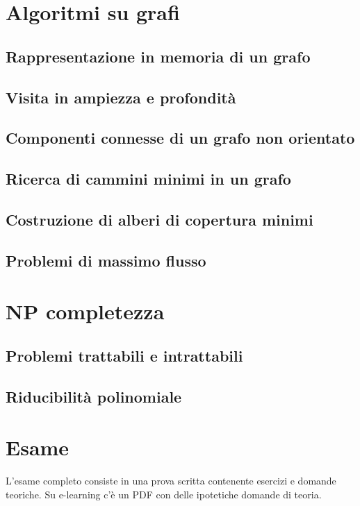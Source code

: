 \documentclass[12pt, a4paper, openany]{book}
\begin{document}
\chapter{Algoritmi su grafi}

\section{Rappresentazione in memoria di un grafo}
\section{Visita in ampiezza e profondità}
\section{Componenti connesse di un grafo non orientato}
\section{Ricerca di cammini minimi in un grafo}
\section{Costruzione di alberi di copertura minimi}
\section{Problemi di massimo flusso}

\chapter{NP completezza}

\section{Problemi trattabili e intrattabili}
\section{Riducibilità polinomiale}

\chapter{Esame}
L'esame completo consiste in una prova scritta contenente esercizi e domande teoriche.
Su e-learning c'è un PDF con delle ipotetiche domande di teoria.
\end{document}
